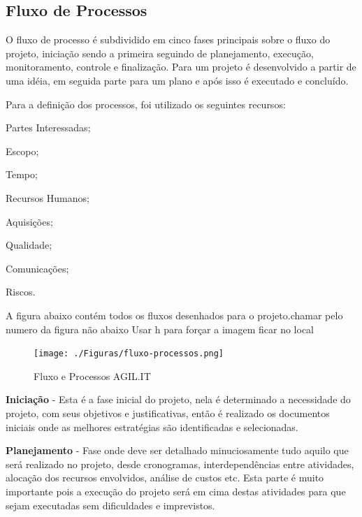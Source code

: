 {	
	\subsection{Fluxo de Processos}
	
	{O fluxo de processo é subdividido em cinco fases principais sobre o fluxo do projeto, iniciação sendo a primeira seguindo de planejamento, execução, monitoramento, controle e finalização. Para \cite{PMG2018} um projeto é desenvolvido a partir de uma idéia, em seguida parte para um plano e após isso é executado e concluído.}
	
	Para a definição dos processos, foi utilizado os seguintes recursos:
	
	\begin{subalineas}
		\item {Partes Interessadas};
		\item {Escopo};
		\item {Tempo};
		\item {Recursos Humanos};
		\item {Aquisições};
		\item {Qualidade};
		\item {Comunicações};
		\item {Riscos}.
	\end{subalineas}
	
	A figura abaixo contém todos os fluxos desenhados para o projeto.{\color{red}chamar pelo numero da figura não abaixo}
	{\color{red} Usar h para forçar a imagem ficar no local}
	
	\begin{figure}[h]
		\caption{\label{Fluxo-Processos}Fluxo e Processos AGIL.IT}
		\begin{center}
			\texttt{[image: ./Figuras/fluxo-processos.png]}
		\end{center}
	\end{figure}
	
	
	
	{\textbf{Iniciação} - Esta é a fase inicial do projeto, nela é determinado a necessidade do projeto, com seus objetivos e justificativas, então é realizado os documentos iniciais onde as melhores estratégias são identificadas e selecionadas.}
	
	{\textbf{Planejamento} - Fase onde deve ser detalhado minuciosamente tudo aquilo que será realizado no projeto, desde cronogramas, interdependências entre atividades, alocação dos recursos envolvidos, análise de custos etc. Esta parte é muito importante pois a execução do projeto será em cima destas atividades para que sejam executadas sem dificuldades e imprevistos.}
	
}
